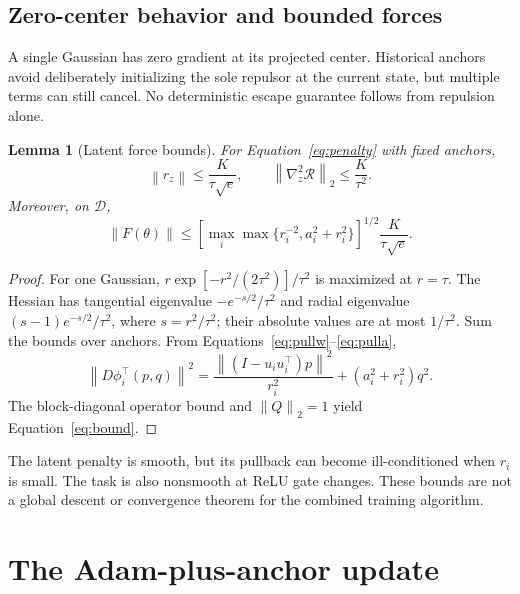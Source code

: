 \documentclass[11pt,letterpaper]{article}
\newtheorem{lemma}{Lemma}
\theoremstyle{remark}\newtheorem{remark}{Remark}
\newcommand{\norm}[1]{\left\lVert#1\right\rVert}
\begin{document}
\subsection{Zero-center behavior and bounded forces}
A single Gaussian has zero gradient at its projected center. Historical anchors avoid deliberately initializing the sole repulsor at the current state, but multiple terms can still cancel. No deterministic escape guarantee follows from repulsion alone.

\begin{lemma}[Latent force bounds]\label{lem:bound}
For Equation~\eqref{eq:penalty} with fixed anchors,
\begin{equation}
\norm{r_z}\le \frac{K}{\tau\sqrt e},\qquad
\norm{\nabla_z^2\mathcal R}_2\le\frac{K}{\tau^2}.
\end{equation}
Moreover, on $\mathcal D$,
\begin{equation}\label{eq:bound}
\norm{F(\theta)}\le
\left[\max_i\max\{r_i^{-2},a_i^2+r_i^2\}\right]^{1/2}
\frac{K}{\tau\sqrt e}.
\end{equation}
\end{lemma}
\begin{proof}
For one Gaussian, $r\exp[-r^2/(2\tau^2)]/\tau^2$ is maximized at $r=\tau$. The Hessian has tangential eigenvalue $-e^{-s/2}/\tau^2$ and radial eigenvalue $(s-1)e^{-s/2}/\tau^2$, where $s=r^2/\tau^2$; their absolute values are at most $1/\tau^2$. Sum the bounds over anchors. From Equations~\eqref{eq:pullw}--\eqref{eq:pulla},
\[
\norm{D\phi_i^\top(p,q)}^2
=\frac{\norm{(I-u_iu_i^\top)p}^2}{r_i^2}+(a_i^2+r_i^2)q^2.
\]
The block-diagonal operator bound and $\norm Q_2=1$ yield Equation~\eqref{eq:bound}.
\end{proof}
The latent penalty is smooth, but its pullback can become ill-conditioned when $r_i$ is small. The task is also nonsmooth at ReLU gate changes. These bounds are not a global descent or convergence theorem for the combined training algorithm.

\section{The Adam-plus-anchor update}\label{sec:update}
\end{document}
